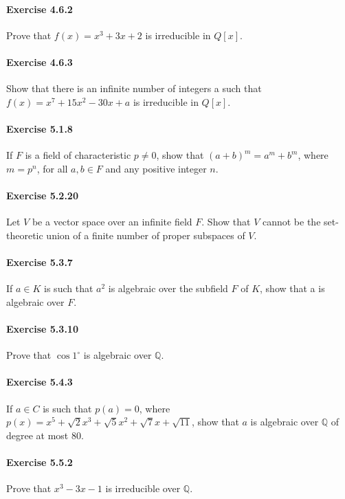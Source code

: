 \documentclass{article}
\begin{document}
\paragraph{Exercise 4.6.2} Prove that $f(x) = x^3 + 3x + 2$ is irreducible in $Q[x]$.

\paragraph{Exercise 4.6.3} Show that there is an infinite number of integers a such that $f(x) = x^7 + 15x^2 - 30x + a$ is irreducible in $Q[x]$.

\paragraph{Exercise 5.1.8} If $F$ is a field of characteristic $p \neq 0$, show that $(a + b)^m = a^m + b^m$, where $m = p^n$, for all $a, b \in F$ and any positive integer $n$.

\paragraph{Exercise 5.2.20} Let $V$ be a vector space over an infinite field $F$. Show that $V$ cannot be the set-theoretic union of a finite number of proper subspaces of $V$.

\paragraph{Exercise 5.3.7} If $a \in K$ is such that $a^2$ is algebraic over the subfield $F$ of $K$, show that a is algebraic over $F$.

\paragraph{Exercise 5.3.10} Prove that $\cos 1^{\circ}$  is algebraic over $\mathbb{Q}$.

\paragraph{Exercise 5.4.3} If $a \in C$ is such that $p(a) = 0$, where $p(x) = x^5 + \sqrt{2}x^3 + \sqrt{5}x^2 + \sqrt{7}x + \sqrt{11}$, show that $a$ is algebraic over $\mathbb{Q}$ of degree at most 80.

\paragraph{Exercise 5.5.2} Prove that $x^3 - 3x - 1$ is irreducible over $\mathbb{Q}$.
\end{document}
